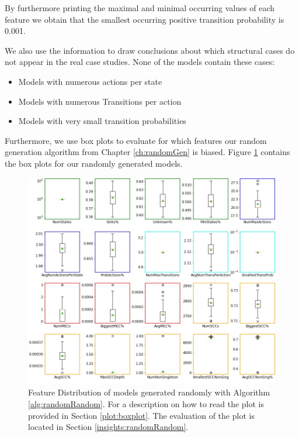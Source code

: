 By furthermore printing the maximal and minimal occurring values of each feature we obtain that the smallest occurring positive transition probability is 0.001.

We also use the information to draw conclusions about which structural cases do not appear in the real case studies. 
None of the models contain these cases:
\begin{itemize}
    \item Models with numerous actions per state
    \item Models with numerous Transitions per action
    \item Models with very small transition probabilities
\end{itemize}
\FloatBarrier
Furthermore, we use box plots to evaluate for which features our random generation algorithm from Chapter \ref{ch:randomGen} is biased.
Figure \ref{fig:Random_FeatureDistribution} contains the box plots for our randomly generated models.
\begin{figure}[h!]
    \centering
    \includegraphics[width=1\textwidth]{figures/RandomRandom_FeatureDistribution.jpg}
    \caption[Feature Distribution of random models]{
        Feature Distribution of models generated randomly with Algorithm \ref{alg:randomRandom}. For a description on how to read the plot is provided in Section \ref{plot:boxplot}.
        The evaluation of the plot is located in Section \ref{insights:randomRandom}.
    }
    \label{fig:Random_FeatureDistribution}
\end{figure}
\FloatBarrier


